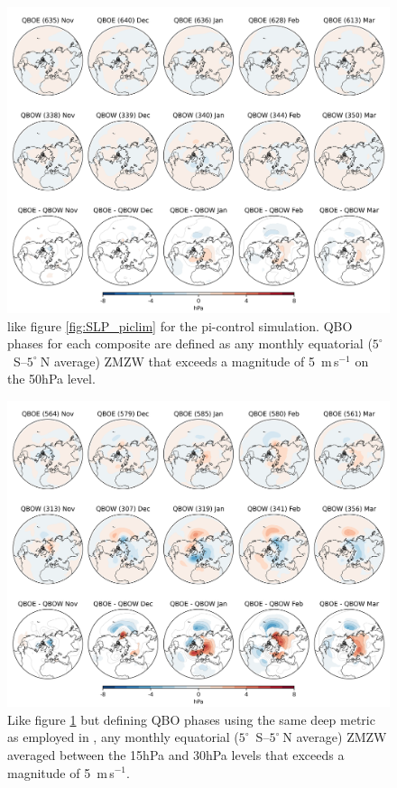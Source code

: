 \begin{figure}[h!]
\begin{center}
\noindent\includegraphics[width = 0.8\linewidth]{Figures/Figures-deepQBO/SLP_composites_individual_months_QBO_phases_U_picontrol_15hPa_5thresh.png}
\caption[MSLP composites under different 50hPa QBO phases in the pi-control simulation]{like figure \ref{fig:SLP_piclim} for the pi-control simulation. QBO phases for each composite are defined as any monthly equatorial ($5^{\circ}$\ S--$5^{\circ}\ $N average) ZMZW that exceeds a magnitude of 5\ m\,s$^{-1}$ on the 50hPa level.}
\label{fig:SLP_picontrol_50}
\end{center}
\end{figure}

\begin{figure}[h!]
\begin{center}
\noindent\includegraphics[width = 0.8\linewidth]{Figures/Figures-deepQBO/SLP_composites_individual_months_QBO_phases_U_picontrol_deephPa_5thresh.png}
\caption[MSLP composites under different deep QBO phases in the pi-control simulation]{Like figure \ref{fig:SLP_picontrol_50} but defining QBO phases using the same deep metric as employed in \cite{andrewsObserved2019d}, any monthly equatorial ($5^{\circ}$\ S--$5^{\circ}\ $N average) ZMZW averaged between the 15hPa and 30hPa levels that exceeds a magnitude of 5\ m\,s$^{-1}$.}
\label{fig:SLP_picontrol_deep}
\end{center}
\end{figure}

